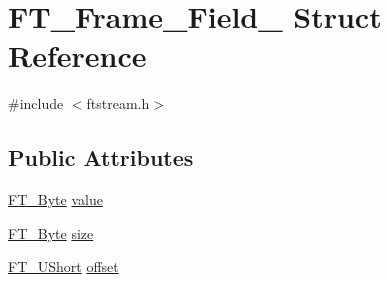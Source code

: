 \hypertarget{struct_f_t___frame___field__}{\section{F\-T\-\_\-\-Frame\-\_\-\-Field\-\_\- Struct Reference}
\label{struct_f_t___frame___field__}
}


{\ttfamily \#include $<$ftstream.\-h$>$}

\subsection*{Public Attributes}
\begin{DoxyCompactItemize}
\item 
\hyperlink{fttypes_8h_a51f26183ca0c9f4af958939648caeccd}{F\-T\-\_\-\-Byte} \hyperlink{struct_f_t___frame___field___a10f91dcdd0a582727b67ad45d42bab41}{value}
\item 
\hyperlink{fttypes_8h_a51f26183ca0c9f4af958939648caeccd}{F\-T\-\_\-\-Byte} \hyperlink{struct_f_t___frame___field___a47e6fbcb90c079421d9d9b64f63a587e}{size}
\item 
\hyperlink{fttypes_8h_a937f6c17cf5ffd09086d8610c37b9f58}{F\-T\-\_\-\-U\-Short} \hyperlink{struct_f_t___frame___field___a85c3275fbb7044f7d6880020b6f0f794}{offset}
\end{DoxyCompactItemize}


